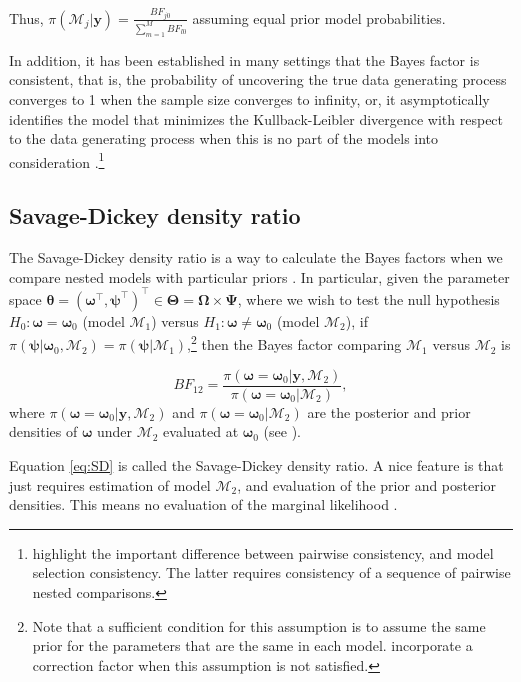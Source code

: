 Thus, $\pi(\mathcal{M}_j |\bm{y})=\frac{BF_{j0}}{\sum_{m=1}^{M}BF_{l0}}$ assuming equal prior model probabilities.

In addition, it has been established in many settings that the Bayes factor is consistent, that is, the probability of uncovering the true data generating process converges to 1 when the sample size converges to infinity, or, it asymptotically identifies the model that minimizes the Kullback-Leibler divergence with respect to the data generating process when this is no part of the models into consideration \cite{chib2016bayes,walker2004new,walker2004modern}.\footnote{\cite{Johnson2012} highlight the important difference between pairwise consistency, and model selection consistency. The latter requires consistency of a sequence of pairwise nested comparisons.}  

\subsection{Savage-Dickey density ratio}\label{sec10_4_1}

The Savage-Dickey density ratio is a way to calculate the Bayes factors when we compare nested models with particular priors \cite{dickey1971weighted,verdinelli1995computing}. In particular, given the parameter space $\bm{\theta}=(\bm{\omega}^{\top}, \bm{\psi}^{\top})^{\top}\in \bm{\Theta}=\bm{\Omega}\times \bm{\Psi}$, where we wish to test the null hypothesis $H_0:\bm{\omega}=\bm{\omega}_0$ (model $\mathcal{M}_1$) versus $H_1:\bm{\omega}\neq \bm{\omega}_0$ (model $\mathcal{M}_2$), if $\pi(\bm{\psi}|\bm{\omega}_0,\mathcal{M}_2)=\pi(\bm{\psi}|\mathcal{M}_1)$,\footnote{Note that a sufficient condition for this assumption is to assume the same prior for the parameters that are the same in each model. \cite{verdinelli1995computing} incorporate a correction factor when this assumption is not satisfied.} then the Bayes factor comparing $\mathcal{M}_1$ versus $\mathcal{M}_2$ is

\begin{equation}\label{eq:SD}
	BF_{12}=\frac{\pi(\bm{\omega}=\bm{\omega}_0|\bm{y},\mathcal{M}_2)}{\pi(\bm{\omega}=\bm{\omega}_0|\mathcal{M}_2)},
\end{equation}
where $\pi(\bm{\omega}=\bm{\omega}_0|\bm{y},\mathcal{M}_2)$ and $\pi(\bm{\omega}=\bm{\omega}_0|\mathcal{M}_2)$ are the posterior and prior densities of $\bm{\omega}$ under $\mathcal{M}_2$ evaluated at $\bm{\omega}_0$ (see \cite{verdinelli1995computing}). 

Equation \ref{eq:SD} is called the Savage-Dickey density ratio. A nice feature is that just requires estimation of model $\mathcal{M}_2$, and evaluation of the prior and posterior densities. This means no evaluation of the marginal likelihood \cite[Chap.~4]{koop2003bayesian}.\\

